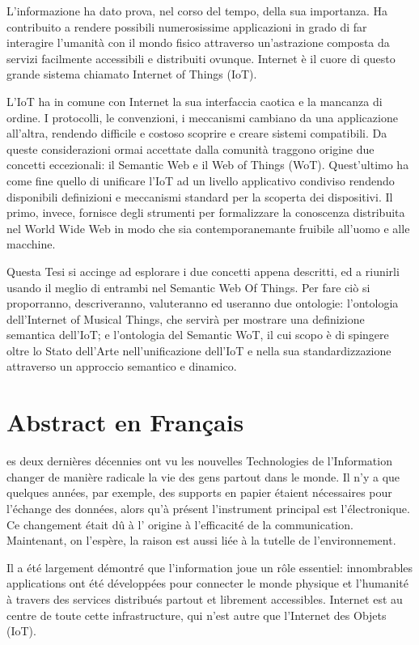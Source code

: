 L'informazione ha dato prova, nel corso del tempo, della sua importanza. Ha contribuito a rendere possibili numerosissime applicazioni in grado di far interagire l'umanità con il mondo fisico attraverso un'astrazione composta da servizi facilmente accessibili e distribuiti ovunque. Internet è il cuore di questo grande sistema chiamato Internet of Things (IoT).

L'IoT ha in comune con Internet la sua interfaccia caotica e la mancanza di ordine. I protocolli, le convenzioni, i meccanismi cambiano da una applicazione all'altra, rendendo difficile e costoso scoprire e creare sistemi compatibili. Da queste considerazioni ormai accettate dalla comunità traggono origine due concetti eccezionali: il Semantic Web e il Web of Things (WoT). Quest'ultimo ha come fine quello di unificare l'IoT ad un livello applicativo condiviso rendendo disponibili definizioni e meccanismi standard per la scoperta dei dispositivi. Il primo, invece, fornisce degli strumenti per formalizzare la conoscenza distribuita nel World Wide Web in modo che sia contemporanemante fruibile all'uomo e alle macchine.

Questa Tesi si accinge ad esplorare i due concetti appena descritti, ed a riunirli usando il meglio di entrambi nel Semantic Web Of Things. Per fare ciò si proporranno, descriveranno, valuteranno ed useranno due ontologie: l'ontologia dell'Internet of Musical Things, che servirà per mostrare una definizione semantica dell'IoT; e l'ontologia del Semantic WoT, il cui scopo è di spingere oltre lo Stato dell'Arte nell'unificazione dell'IoT e nella sua standardizzazione attraverso un approccio semantico e dinamico.

\chapter*{Abstract en Fran\c{c}ais}
es deux dernières décennies ont vu les nouvelles Technologies de l'Information changer de manière radicale la vie des gens partout dans le monde. Il n'y a que quelques années, par exemple, des supports en papier étaient nécessaires pour l'échange des données, alors qu'à présent l'instrument principal est l'électronique. Ce changement était d\^u à l' origine à l'efficacité de la communication. Maintenant, on l'espère, la raison est aussi liée à la tutelle de l'environnement.

Il a été largement démontré que l'information joue un r\^ole essentiel: innombrables applications ont été développées pour connecter le monde physique et l'humanité à travers des services distribués partout et librement accessibles. Internet est au centre de toute cette infrastructure, qui n'est autre que l'Internet des Objets (IoT).

